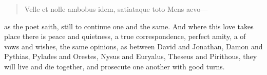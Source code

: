 {\begin{latin}
\begin{verse}%
Velle et nolle ambobus idem, satiataque toto
Mens aevo---
\end{verse}%
\end{latin}

as the poet saith, still to continue one and the same. And where this
love takes place there is peace and quietness, a true correspondence,
perfect amity, a  of vows and wishes, the same opinions, as
between  David and Jonathan, Damon and Pythias, Pylades and
Orestes, Nysus and Euryalus, Theseus and Pirithous, they
will live and die together, and prosecute one another with good turns.

}
